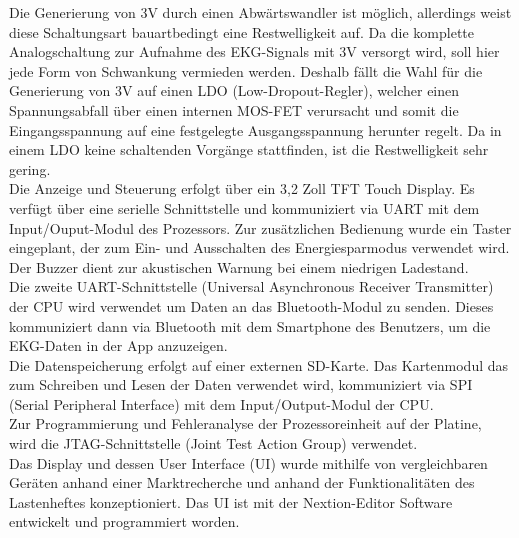Die Generierung von 3V durch einen Abwärtswandler ist möglich, allerdings weist diese Schaltungsart bauartbedingt eine Restwelligkeit auf. Da die komplette Analogschaltung zur Aufnahme des EKG-Signals mit 3V versorgt wird, soll hier jede Form von Schwankung vermieden werden.
Deshalb fällt die Wahl für die Generierung von 3V auf einen LDO (Low-Dropout-Regler), welcher einen Spannungsabfall über einen internen MOS-FET verursacht und somit die Eingangsspannung auf eine festgelegte Ausgangsspannung herunter regelt. Da in einem LDO keine schaltenden Vorgänge stattfinden, ist die Restwelligkeit sehr gering.\\

Die Anzeige und Steuerung erfolgt über ein 3,2 Zoll TFT Touch Display. Es verfügt über eine serielle Schnittstelle und kommuniziert via UART mit dem Input/Ouput-Modul des Prozessors. Zur zusätzlichen Bedienung wurde ein Taster eingeplant, der zum Ein- und Ausschalten des Energiesparmodus verwendet wird. Der Buzzer dient zur akustischen Warnung bei einem niedrigen Ladestand.\\

Die zweite UART-Schnittstelle (Universal Asynchronous Receiver Transmitter) der CPU wird verwendet um Daten an das Bluetooth-Modul zu senden. Dieses kommuniziert dann via Bluetooth mit dem Smartphone des Benutzers, um die EKG-Daten in der App anzuzeigen.\\

Die Datenspeicherung erfolgt auf einer externen SD-Karte. Das Kartenmodul das zum Schreiben und Lesen der Daten verwendet wird, kommuniziert via SPI (Serial Peripheral Interface) mit dem Input/Output-Modul der CPU.\\

Zur Programmierung und Fehleranalyse der Prozessoreinheit auf der Platine, wird die JTAG-Schnittstelle (Joint Test Action Group) verwendet.\\

Das Display und dessen User Interface (UI) wurde mithilfe von vergleichbaren Geräten anhand einer Marktrecherche und anhand der Funktionalitäten des Lastenheftes konzeptioniert. Das UI ist mit der Nextion-Editor Software entwickelt und programmiert worden.
\\

